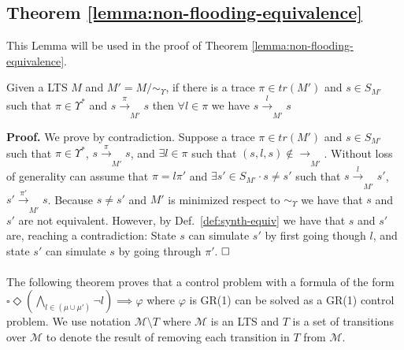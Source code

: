 \subsection{Theorem \ref{lemma:non-flooding-equivalence}}
This Lemma will be used in the proof of Theorem \ref{lemma:non-flooding-equivalence}.
\begin{lemma}
    \label{lemma:selfloop-traces-mu}
    Given a LTS $M$ and $M' = M / \! \sim_\Upsilon$, if there is a trace $\pi \in tr(M')$ and $s\in S_{M'}$ such that $\pi \in \Upsilon^*$ and $s \xrightarrow[]{\pi}_{M'} s$ then $\forall l \in \pi$ we have $s \xrightarrow[]{l}_{M'} s $ 
\end{lemma}
\textbf{Proof.}
We prove by contradiction. Suppose a trace $\pi \in tr(M')$ and $s\in S_{M'}$ such that $\pi \in \Upsilon^*$, $s \xrightarrow[]{\pi}_{M'} s$, and $\exists l \in \pi$ such that $(s, l, s) \notin \xrightarrow[]{}_{M'}$.
Without loss of generality can assume that $\pi = l \pi'$ and $\exists s' \in S_{M'} \cdot s\neq s'$ such that  $s\xrightarrow[]{l}_{M'} \!s'$, $s'\xrightarrow[]{\pi'}_{M'} \!s$. 
Because $s \neq s'$ and $M'$ is minimized respect to $\sim_{\Upsilon}$ we have that $s$ and $s'$ are not equivalent.  However, by Def.~\ref{def:synth-equiv} we have that $s$ and $s'$ are, reaching a contradiction: State $s$ can simulate $s'$ by first going though $l$, and state $s'$ can simulate $s$ by going through $\pi'$.
$\hfill \square$
\\
\\
\noindent The following theorem proves that  a control problem with a formula  of the form $\square \Diamond (\bigwedge_{l \in (\mu \cup \mu')} \neg l) \implies \varphi$ where $\varphi$ is  GR(1)  can be solved as a GR(1) control problem. We use notation $\mathcal{M} \setminus T$ where $\mathcal{M}$ is an LTS and $T$ is a set of transitions over $\mathcal{M}$ to denote the result of removing each transition in $T$ from $\mathcal{M}$. 

